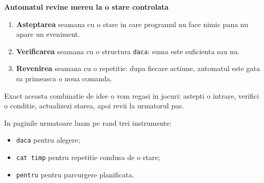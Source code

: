 \clearpage
\thispagestyle{empty}


\begin{center}
{\Large\bfseries Automatul revine mereu la o stare controlata}
\end{center}

\vspace{0.8em}

\begin{tcolorbox}[colback=white!8!cqink,colframe=cqlime,coltitle=white,coltext=white,fonttitle=\bfseries,title=Cum traducem automatul in programare]
\begin{enumerate}
\item \textbf{Asteptarea} seamana cu o stare in care programul nu face nimic pana nu apare un eveniment.
\item \textbf{Verificarea} seamana cu o structura \texttt{daca}: suma este suficienta sau nu.
\item \textbf{Revenirea} seamana cu o repetitie: dupa fiecare actiune, automatul este gata sa primeasca o noua comanda.
\end{enumerate}

Exact aceasta combinatie de idee o vom regasi in jocuri: astepti o intrare, verifici o conditie, actualizezi starea, apoi revii la urmatorul pas.
\end{tcolorbox}

\vfill

\begin{checkpointbox}
In paginile urmatoare luam pe rand trei instrumente:
\begin{itemize}
\item \texttt{daca} pentru alegere;
\item \texttt{cat timp} pentru repetitie condusa de o stare;
\item \texttt{pentru} pentru parcurgere planificata.
\end{itemize}
\end{checkpointbox}

